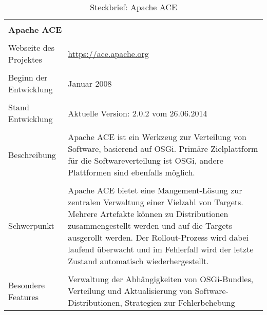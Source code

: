 
\begin{table}[H]
 \centering
 \caption{Steckbrief: Apache ACE}
 \begin{framed}
 \begin{tabular}{l|l|l|l}
  \multicolumn{4}{l}{}\\
  \multicolumn{4}{l}{\textbf{Apache ACE}}\\
  \multicolumn{4}{l}{}\\
  \toprule
  \multicolumn{2}{l|}{Webseite des Projektes} & \multicolumn{2}{p{8cm}}{\url{https://ace.apache.org}}\\
  
  \multicolumn{2}{l|}{} & \multicolumn{2}{l}{}\\
  
  \multicolumn{2}{l|}{Beginn der Entwicklung} & \multicolumn{2}{p{8cm}}{Januar 2008}\\
  
  \multicolumn{2}{l|}{} & \multicolumn{2}{l}{}\\
  
  \multicolumn{2}{l|}{Stand Entwicklung} & \multicolumn{2}{p{8cm}}{Aktuelle Version: 2.0.2 vom 26.06.2014} \\
  
  \multicolumn{2}{l|}{} & \multicolumn{2}{l}{} \\
  
  \multicolumn{2}{l|}{Beschreibung} &  \multicolumn{2}{p{8cm}}{
  Apache ACE ist ein Werkzeug zur Verteilung von Software, basierend auf OSGi.
  Primäre Zielplattform für die Softwareverteilung ist OSGi, andere Plattformen sind ebenfalls möglich.
  } \\
  
  \multicolumn{2}{l|}{} & \multicolumn{2}{l}{} \\
  
  \multicolumn{2}{l|}{Schwerpunkt} &  \multicolumn{2}{p{8cm}}{
  Apache ACE bietet eine Mangement-Lösung zur zentralen Verwaltung einer Vielzahl von Targets.
  Mehrere Artefakte können zu Distributionen zusammengestellt werden und auf die Targets ausgerollt werden.
  Der Rollout-Prozess wird dabei laufend überwacht und im Fehlerfall wird der letzte Zustand automatisch wiederhergestellt.
  } \\
  
  \multicolumn{2}{l|}{} & \multicolumn{2}{l}{} \\
  
  \multicolumn{2}{l|}{Besondere Features} & \multicolumn{2}{p{8cm}}{
  Verwaltung der Abhängigkeiten von OSGi-Bundles,
  Verteilung und Aktualisierung von Software-Distributionen,
  Strategien zur Fehlerbehebung} \\
  

\end{tabular}
\end{framed}
\end{table}
